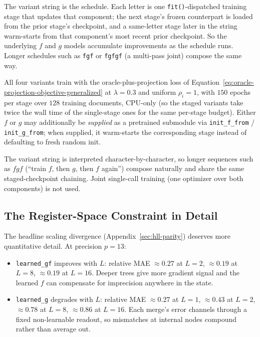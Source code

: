 The variant string is the schedule. Each letter is one
\texttt{fit()}-dispatched training stage that updates that component;
the next stage's frozen counterpart is loaded from the prior stage's
checkpoint, and a same-letter stage later in the string warm-starts
from that component's most recent prior checkpoint. So the underlying
$f$ and $g$ models accumulate improvements as the schedule runs.
Longer schedules such as \texttt{fgf} or \texttt{fgfgf} (a multi-pass
joint) compose the same way.

All four variants train with the oracle-plus-projection loss of
Equation~\eqref{eq:oracle-projection-objective-generalized} at
$\lambda = 0.3$ and uniform $\rho_i = 1$, with $150$ epochs per stage
over $128$ training documents, CPU-only (so the staged variants take
twice the wall time of the single-stage ones for the same per-stage
budget). Either $f$ or $g$ may additionally be \emph{supplied} as a
pretrained submodule via \texttt{init\_f\_from} / \texttt{init\_g\_from};
when supplied, it warm-starts the corresponding stage instead of
defaulting to fresh random init.

The variant string is interpreted character-by-character, so longer
sequences such as $fgf$ (``train $f$, then $g$, then $f$ again'') compose
naturally and share the same staged-checkpoint chaining. Joint
single-call training (one optimizer over both components) is not used.

\subsection{The Register-Space Constraint in Detail}

The headline scaling divergence (Appendix~\ref{sec:hll-parity}) deserves
more quantitative detail. At precision $p = 13$:

\begin{itemize}
\item \texttt{learned\_gf} improves with $L$: relative MAE $\approx 0.27$ at $L=2$, $\approx 0.19$ at $L=8$, $\approx 0.19$ at $L=16$. Deeper trees give more gradient signal and the learned $f$ can compensate for imprecision anywhere in the state.
\item \texttt{learned\_g} degrades with $L$: relative MAE $\approx 0.27$ at $L=1$, $\approx 0.43$ at $L=2$, $\approx 0.78$ at $L=8$, $\approx 0.86$ at $L=16$. Each merge's error channels through a fixed non-learnable readout, so mismatches at internal nodes compound rather than average out.
\end{itemize}

